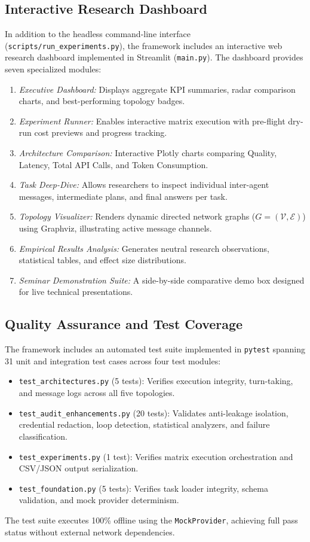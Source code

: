 \subsection{Interactive Research Dashboard}
In addition to the headless command-line interface (\texttt{scripts/run\_experiments.py}), the framework includes an interactive web research dashboard implemented in Streamlit (\texttt{main.py}). The dashboard provides seven specialized modules:
\begin{enumerate}
    \item \textit{Executive Dashboard:} Displays aggregate KPI summaries, radar comparison charts, and best-performing topology badges.
    \item \textit{Experiment Runner:} Enables interactive matrix execution with pre-flight dry-run cost previews and progress tracking.
    \item \textit{Architecture Comparison:} Interactive Plotly charts comparing Quality, Latency, Total API Calls, and Token Consumption.
    \item \textit{Task Deep-Dive:} Allows researchers to inspect individual inter-agent messages, intermediate plans, and final answers per task.
    \item \textit{Topology Visualizer:} Renders dynamic directed network graphs ($G=(\mathcal{V}, \mathcal{E})$) using Graphviz, illustrating active message channels.
    \item \textit{Empirical Results Analysis:} Generates neutral research observations, statistical tables, and effect size distributions.
    \item \textit{Seminar Demonstration Suite:} A side-by-side comparative demo box designed for live technical presentations.
\end{enumerate}

\subsection{Quality Assurance and Test Coverage}
The framework includes an automated test suite implemented in \texttt{pytest} spanning 31 unit and integration test cases across four test modules:
\begin{itemize}
    \item \texttt{test\_architectures.py} (5 tests): Verifies execution integrity, turn-taking, and message logs across all five topologies.
    \item \texttt{test\_audit\_enhancements.py} (20 tests): Validates anti-leakage isolation, credential redaction, loop detection, statistical analyzers, and failure classification.
    \item \texttt{test\_experiments.py} (1 test): Verifies matrix execution orchestration and CSV/JSON output serialization.
    \item \texttt{test\_foundation.py} (5 tests): Verifies task loader integrity, schema validation, and mock provider determinism.
\end{itemize}
The test suite executes 100\% offline using the \texttt{MockProvider}, achieving full pass status without external network dependencies.

